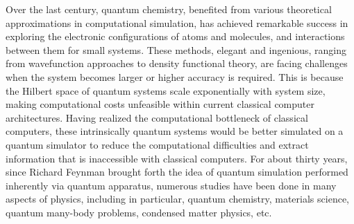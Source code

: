\documentclass[8.5pt,twoside,twocolumn]{article}
\begin{document}

Over the last century, quantum chemistry, benefited from various theoretical approximations
in computational simulation, has achieved remarkable success in
exploring the electronic configurations of atoms and molecules,
and interactions between them for small systems.\cite{Approximate}
These methods, elegant and ingenious,
ranging from wavefunction approaches to density functional theory,
are facing challenges when the system becomes larger
or higher accuracy is required.
This is because the Hilbert space of quantum systems
scale exponentially with system size, making
computational costs unfeasible within current
classical computer architectures.
Having realized the computational bottleneck of classical computers,
these intrinsically quantum systems would be better simulated
on a quantum simulator to reduce the computational
difficulties and extract information that is inaccessible
with classical computers.
For about thirty years, since Richard Feynman
brought forth the idea of quantum simulation
performed inherently via quantum apparatus,\cite{Feynman}
numerous studies have been done
in many aspects of physics,\cite{Lewensitein}
including in particular, quantum chemistry, materials science,
quantum many-body problems, condensed matter physics, etc.
\end{document}

